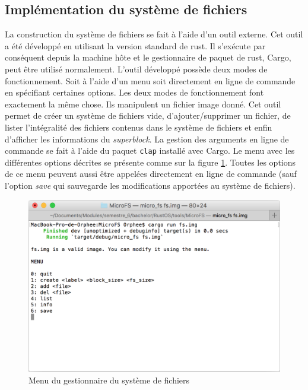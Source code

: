 
\subsection{Implémentation du système de fichiers}
La construction du système de fichiers se fait à l'aide d'un outil externe. Cet
outil a été développé en utilisant la version standard de rust. Il s'exécute
par conséquent depuis la machine hôte et le gestionnaire de paquet de rust, Cargo,
peut être utilisé normalement. L'outil développé possède deux
modes de fonctionnement. Soit à l'aide d'un menu soit directement en ligne de
commande en spécifiant certaines options. Les deux modes de fonctionnement
font exactement la même chose. Ils manipulent un fichier image donné.
Cet outil permet de créer un système de fichiers vide, d'ajouter/supprimer
un fichier, de lister l'intégralité des fichiers contenus dans le système de fichiers et enfin
d'afficher les informations du \textit{superblock}. La gestion des arguments en
ligne de commande se fait à l'aide du paquet \texttt{clap} installé avec
Cargo. Le menu avec les différentes options décrites se présente comme sur la figure
\ref{microfs_menu}. Toutes les options de ce menu peuvent aussi être appelées
directement en ligne de commande (sauf l'option \textit{save} qui sauvegarde les
modifications apportées au système de fichiers). \\ 

\begin{figure}[!h]
  \centering
  \includegraphics[scale=0.6]{images/microfs_menu.png}
  \caption{Menu du gestionnaire du système de fichiers}
  \label{microfs_menu}
\end{figure}

